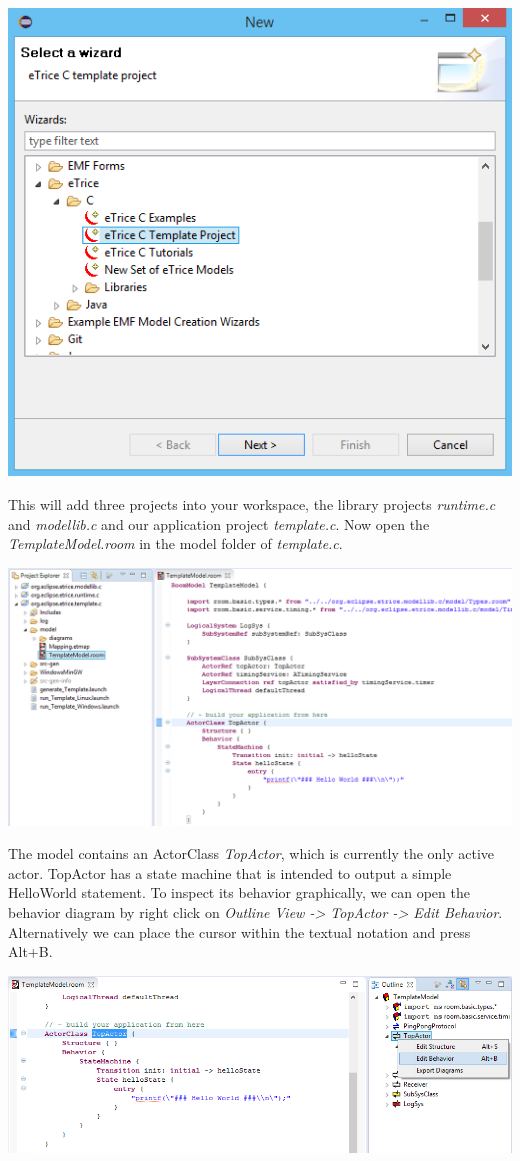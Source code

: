 \includegraphics[width=.5\textwidth]{images/013-wizard.png}

This will add three projects into your workspace, the library projects \emph{runtime.c} and \emph{modellib.c} and our application project \emph{template.c}. Now open the \emph{TemplateModel.room} in the model folder of \emph{template.c}.

\includegraphics[width=\textwidth]{images/013-after-wizard.png}

The model contains an ActorClass \emph{TopActor}, which is currently the only active actor. TopActor has a state machine that is intended to output a simple HelloWorld statement. To inspect its behavior graphically, we can open the behavior diagram by right click on \emph{Outline View -> TopActor -> Edit Behavior}. Alternatively we can place the cursor within the textual notation and press Alt+B.

\includegraphics[width=\textwidth]{images/013-open-hello-fsm.png}

